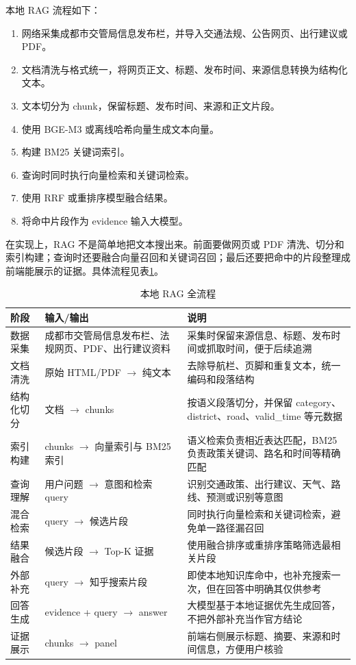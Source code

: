 \documentclass[bwprint]{report}
\begin{document}
本地 RAG 流程如下：
\begin{enumerate}
    \item 网络采集成都市交管局信息发布栏，并导入交通法规、公告网页、出行建议或 PDF。
    \item 文档清洗与格式统一，将网页正文、标题、发布时间、来源信息转换为结构化文本。
    \item 文本切分为 chunk，保留标题、发布时间、来源和正文片段。
    \item 使用 BGE-M3 或离线哈希向量生成文本向量。
    \item 构建 BM25 关键词索引。
    \item 查询时同时执行向量检索和关键词检索。
    \item 使用 RRF 或重排序模型融合结果。
    \item 将命中片段作为 evidence 输入大模型。
\end{enumerate}

在实现上，RAG 不是简单地把文本搜出来。前面要做网页或 PDF 清洗、切分和索引构建；查询时还要融合向量召回和关键词召回；最后还要把命中的片段整理成前端能展示的证据。具体流程见表\ref{tab:rag-flow}。

\begin{table}[H]
    \caption{本地 RAG 全流程}
    \label{tab:rag-flow}
    \centering
    \small
    \begin{tabular}{p{}p{}p{}}
        \toprule[1.5pt]
        阶段 & 输入/输出 & 说明 \\
        \midrule[1pt]
        数据采集 & 成都市交管局信息发布栏、法规网页、PDF、出行建议资料 & 采集时保留来源信息、标题、发布时间或抓取时间，便于后续追溯 \\
        文档清洗 & 原始 HTML/PDF $\rightarrow$ 纯文本 & 去除导航栏、页脚和重复文本，统一编码和段落结构 \\
        结构化切分 & 文档 $\rightarrow$ chunks & 按语义段落切分，并保留 category、district、road、valid\_time 等元数据 \\
        索引构建 & chunks $\rightarrow$ 向量索引与 BM25 索引 & 语义检索负责相近表达匹配，BM25 负责政策关键词、路名和时间等精确匹配 \\
        查询理解 & 用户问题 $\rightarrow$ 意图和检索 query & 识别交通政策、出行建议、天气、路线、预测或识别等意图 \\
        混合检索 & query $\rightarrow$ 候选片段 & 同时执行向量检索和关键词检索，避免单一路径漏召回 \\
        结果融合 & 候选片段 $\rightarrow$ Top-K 证据 & 使用融合排序或重排序策略筛选最相关片段 \\
        外部补充 & query $\rightarrow$ 知乎搜索片段 & 即使本地知识库命中，也补充搜索一次，但在回答中明确其仅供参考 \\
        回答生成 & evidence + query $\rightarrow$ answer & 大模型基于本地证据优先生成回答，不把外部补充当作官方结论 \\
        证据展示 & chunks $\rightarrow$ panel & 前端右侧展示标题、摘要、来源和时间信息，方便用户核验 \\
        \bottomrule[1.5pt]
    \end{tabular}
\end{table}
\end{document}

